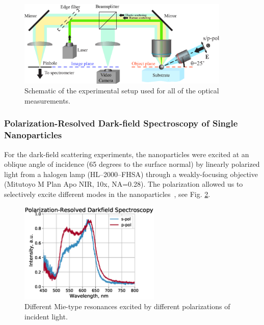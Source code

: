             \begin{figure}[!ht]
                    \begin{center}
                        \includegraphics[width=0.9\textwidth]{figs/methods/expSetup2.eps}
                    \end{center}
                    \caption{Schematic of the experimental setup used for all of the optical measurements.}
                    \label{fig:expSetup}
            \end{figure}

        \subsubsection{Polarization-Resolved Dark-field Spectroscopy of Single Nanoparticles}
            \label{sec:Darkfield}
                For the dark-field scattering experiments, the nanoparticles were excited at an oblique angle of incidence
            (65 degrees to the surface normal) by linearly polarized light from a halogen lamp (HL--2000--FHSA)
            through a weakly-focusing objective (Mitutoyo M Plan Apo NIR, 10x, NA=0.28). The polarization allowed us to
            selectively excite different modes in the nanoparticles~\cite{permyakov2015probing}, see Fig. \ref{fig:PolarizedDF}.

            \begin{figure}[!ht]
                    \begin{center}
                        \includegraphics[width=0.6\textwidth]{figs/methods/DF/id_52780.eps}
                    \end{center}
                    \caption{Different Mie-type resonances excited by different polarizations of incident light.}
                    \label{fig:PolarizedDF}
            \end{figure}

